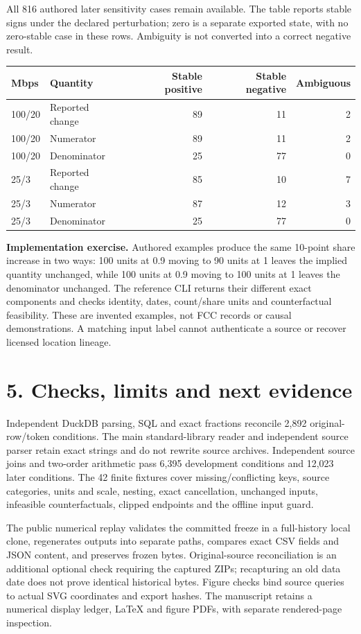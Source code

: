 \documentclass[10pt,letterpaper]{article}
\begin{document}
All 816 authored later sensitivity cases remain available. The table reports stable signs under the declared perturbation; zero is a separate exported state, with no zero-stable case in these rows. Ambiguity is not converted into a correct negative result.
\begin{center}\small\begin{tabular}{@{}llrrr@{}}\toprule
Mbps & Quantity & Stable positive & Stable negative & Ambiguous\\\midrule
100/20 & Reported change & 89 & 11 & 2 \\
100/20 & Numerator & 89 & 11 & 2 \\
100/20 & Denominator & 25 & 77 & 0 \\
25/3 & Reported change & 85 & 10 & 7 \\
25/3 & Numerator & 87 & 12 & 3 \\
25/3 & Denominator & 25 & 77 & 0 \\
\bottomrule\end{tabular}\end{center}

\textbf{Implementation exercise.} Authored examples produce the same 10-point share increase in two ways: 100 units at 0.9 moving to 90 units at 1 leaves the implied quantity unchanged, while 100 units at 0.9 moving to 100 units at 1 leaves the denominator unchanged. The reference CLI returns their different exact components and checks identity, dates, count/share units and counterfactual feasibility. These are invented examples, not FCC records or causal demonstrations. A matching input label cannot authenticate a source or recover licensed location lineage.
\newpage
\section*{5. Checks, limits and next evidence}
Independent DuckDB parsing, SQL and exact fractions reconcile 2,892 original-row/token conditions. The main standard-library reader and independent source parser retain exact strings and do not rewrite source archives. Independent source joins and two-order arithmetic pass 6,395 development conditions and 12,023 later conditions. The 42 finite fixtures cover missing/conflicting keys, source categories, units and scale, nesting, exact cancellation, unchanged inputs, infeasible counterfactuals, clipped endpoints and the offline input guard.

The public numerical replay validates the committed freeze in a full-history local clone, regenerates outputs into separate paths, compares exact CSV fields and JSON content, and preserves frozen bytes. Original-source reconciliation is an additional optional check requiring the captured ZIPs; recapturing an old data date does not prove identical historical bytes. Figure checks bind source queries to actual SVG coordinates and export hashes. The manuscript retains a numerical display ledger, LaTeX and figure PDFs, with separate rendered-page inspection.
\end{document}
